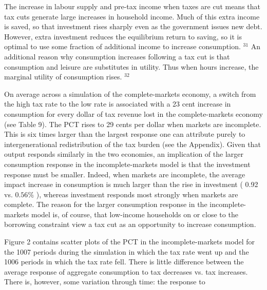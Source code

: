 \documentclass[11pt]{article}
\begin{document}
The increase in labour supply and pre-tax income when taxes are cut means that tax cuts generate large increases in household income. Much of this extra income is saved, so that investment rises sharply even as the government issues new debt. However, extra investment reduces the equilibrium return to saving, so it is optimal to use some fraction of additional income to increase consumption. ${ }^{31}$ An additional reason why consumption increases following a tax cut is that consumption and leisure are substitutes in utility. Thus when hours increase, the marginal utility of consumption rises. ${ }^{32}$

On average across a simulation of the complete-markets economy, a switch from the high tax rate to the low rate is associated with a 23 cent increase in consumption for every dollar of tax revenue lost in the complete-markets economy (see Table 9). The PCT rises to 29 cents per dollar when markets are incomplete. This is six times larger than the largest response one can attribute purely to intergenerational redistribution of the tax burden (see the Appendix). Given that output responds similarly in the two economies, an implication of the larger consumption response in the incomplete-markets model is that the investment response must be smaller. Indeed, when markets are incomplete, the average impact increase in consumption is much larger than the rise in investment ( 0.92 vs. $0.56 \%$ ), whereas investment responds most strongly when markets are complete. The reason for the larger consumption response in the incomplete-markets model is, of course, that low-income households on or close to the borrowing constraint view a tax cut as an opportunity to increase consumption.

Figure 2 contains scatter plots of the PCT in the incomplete-markets model for the 1007 periods during the simulation in which the tax rate went up and the 1006 periods in which the tax rate fell. There is little difference between the average response of aggregate consumption to tax decreases vs. tax increases. There is, however, some variation through time: the response to
\end{document}
